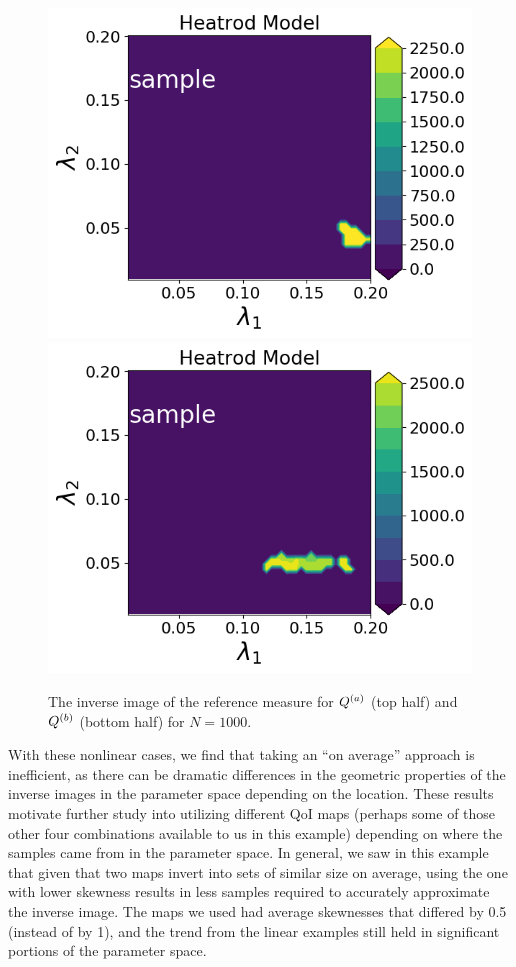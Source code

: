 \begin{figure}
\begin{minipage}{.4\textwidth}
\includegraphics[width=\linewidth]{examples/fig_heatrod_q2/HeatrodModel--sample_N50_mc.png}
\includegraphics[width=\linewidth]{examples/fig_heatrod_q2/HeatrodModel--sample_N500_mc.png}
\end{minipage}

\caption{The inverse image of the reference measure for $Q^{(a)}$ (top half) and $Q^{(b)}$ (bottom half) for $N=1000$. }
\label{fig:heatrod-convergence}
\end{figure}

With these nonlinear cases, we find that taking an ``on average'' approach is inefficient, as there can be dramatic differences in the geometric properties of the inverse images in the parameter space depending on the location.
These results motivate further study into utilizing different QoI maps (perhaps some of those other four combinations available to us in this example) depending on where the samples came from in the parameter space.
In general, we saw in this example that given that two maps invert into sets of similar size on average, using the one with lower skewness results in less samples required to accurately approximate the inverse image.
The maps we used had average skewnesses that differed by 0.5 (instead of by 1), and the trend from the linear examples still held in significant portions of the parameter space.
